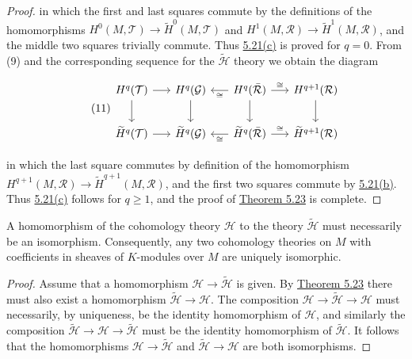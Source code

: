 \begin{proof}
in which the first and last squares commute by the definitions of the homomorphisms $H^{0}(M,\mathcal{T})\to\tilde{H}^{0}(M,\mathcal{T})$ and $H^{1}(M,\mathcal{R})\to\tilde{H}^{1}(M,\mathcal{R})$, and the middle two squares trivially commute. Thus \hyperref[thm:5.21]{5.21(c)} is proved for $q=0$. From (9) and the corresponding sequence for the $\tilde{\mathcal{H}}$ theory we obtain the diagram

\begin{equation}
\tag{11}\label{eq:5.23:11}
\begin{tikzcd}[ampersand replacement=\&, column sep=1.6em,row sep=2em]
H^{q}(\mathcal T) \arrow[r] \arrow[d] \& H^{q}(\mathcal G) \arrow[d] \& H^{q}(\bar{\mathcal R}) \arrow[l ,"{\cong}"] \arrow[r ,"{\cong}"] \arrow[d] \& H^{q+1}(\mathcal R) \arrow[d] \\
\widetilde H^{q}(\mathcal T) \arrow[r] \& \widetilde H^{q}(\mathcal G) \& \widetilde H^{q}(\bar{\mathcal R}) \arrow[l ,"{\cong}"] \arrow[r ,"{\cong}"] \& \widetilde H^{q+1}(\mathcal R)
\end{tikzcd}
\end{equation}

in which the last square commutes by definition of the homomorphism  $ H^{q+1}(M,\mathcal{R}) \to \tilde{H}^{q+1}(M,\mathcal{R}) $, and the first two squares commute by \hyperref[thm:5.21]{5.21(b)}. Thus \hyperref[thm:5.21]{5.21(c)} follows for  $ q \geq 1 $, and the proof of \hyperref[thm:5.23]{Theorem 5.23} is complete.

\end{proof}

\begin{corollary*}
A homomorphism of the cohomology theory $\mathcal{H}$ to the theory $\tilde{\mathcal{H}}$ must necessarily be an isomorphism. Consequently, any two cohomology theories on $M$ with coefficients in sheaves of $K$-modules over $M$ are uniquely isomorphic.

\end{corollary*}

\begin{proof}
Assume that a homomorphism $\mathcal{H}\to\tilde{\mathcal{H}}$ is given. By \hyperref[thm:5.23]{Theorem 5.23} there must also exist a homomorphism $\tilde{\mathcal{H}}\to\mathcal{H}$. The composition $\mathcal{H}\to\tilde{\mathcal{H}}\to\mathcal{H}$ must necessarily, by uniqueness, be the identity homomorphism of $\mathcal{H}$, and similarly the composition $\tilde{\mathcal{H}}\to\mathcal{H}\to\tilde{\mathcal{H}}$ must be the identity homomorphism of $\tilde{\mathcal{H}}$. It follows that the homomorphisms $\mathcal{H}\to\tilde{\mathcal{H}}$ and $\tilde{\mathcal{H}}\to\mathcal{H}$ are both isomorphisms.

\end{proof}

